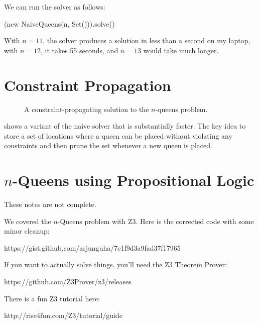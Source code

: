 \documentclass[9pt]{extbook}
\begin{document}
We can run the solver as follows:

\begin{scalacode}
(new NaiveQueens(n, Set())).solve()
\end{scalacode}
With $n = 11$, the solver produces a solution in less than a second on my
laptop, with $n = 12$, it takes 55 seconds, and $n = 13$ would take much longer.

\section{Constraint Propagation}

\begin{figure}
\caption{A constraint-propagating solution to the $n$-queens problem.}
\label{OptQueens}
\end{figure}

 shows a variant of the naive solver that is substantially
faster. The key idea to store a set of locations where a queen can be placed
without violating any constraints and then prune the set whenever a new queen
is placed.


\newlecture

\section{$n$-Queens using Propositional Logic}

\begin{instructor}
These notes are not complete.
\end{instructor}

We covered the $n$-Queens problem with Z3.
Here is the corrected code with some minor cleanup:
 
https://gist.github.com/arjunguha/7c1f9d3a9fad37f17965
 
If you want to actually solve things, you'll need the Z3 Theorem Prover:
 
https://github.com/Z3Prover/z3/releases
 
There is a fun Z3 tutorial here:
 
http://rise4fun.com/Z3/tutorial/guide










\end{document}
